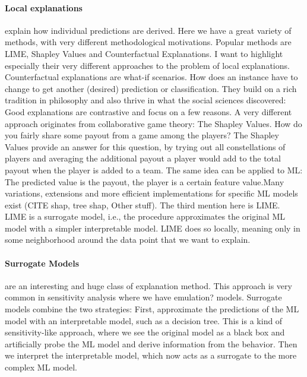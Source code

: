 \documentclass[runningheads]{llncs}
\begin{document}
\paragraph{Local explanations} explain how individual predictions are derived.
Here we have a great variety of methods, with very different methodological motivations.
Popular methods are LIME, Shapley Values and Counterfactual Explanations.
I want to highlight especially their very different approaches to the problem of local explanations.
Counterfactual explanations are what-if scenarios.
How does an instance have to change to get another (desired) prediction or classification.
They build on a rich tradition in philosophy and also thrive in what the social sciences discovered:
Good explanations are contrastive and focus on a few reasons.
A very different approach originates from collaborative game theory: The Shapley Values.
How do you fairly share some payout from a game among the players?
The Shapley Values provide an answer for this question, by trying out all constellations of players and averaging the additional payout a player would add to the total payout when the player is added to a team.
The same idea can be applied to ML: The predicted value is the payout, the player is a certain feature value.Many variations, extensions and more efficient implementations for specific ML models exist (CITE shap, tree shap, Other stuff).
The third mention here is LIME.
LIME is a surrogate model, i.e., the procedure approximates the original ML model with a simpler interpretable model.
LIME does so locally, meaning only in some neighborhood around the data point that we want to explain.

\paragraph{Surrogate Models} are an interesting and huge class of explanation method.
This approach is very common in sensitivity analysis where we have emulation? models.
Surrogate models combine the two strategies:
First, approximate the predictions of the ML model with an interpretable model, such as a decision tree.
This is a kind of sensitivity-like approach, where we see the original model as a black box and artificially probe the ML model and derive information from the behavior.
Then we interpret the interpretable model, which now acts as a surrogate to the more complex ML model.
\end{document}
